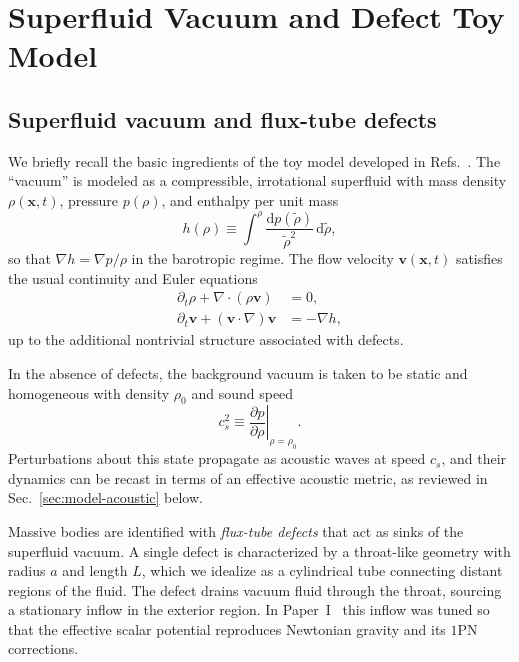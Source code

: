 \documentclass[11pt]{article}
\newcommand{\cS}{c_s}
\newcommand{\dd}{\mathrm{d}}
\begin{document}
\section{Superfluid Vacuum and Defect Toy Model}
\label{sec:model}

\subsection{Superfluid vacuum and flux-tube defects}

We briefly recall the basic ingredients of the toy model developed in Refs.~\cite{Norris:2025Orbits,Norris:Paper2,Norris:Paper3}.  The ``vacuum'' is modeled as a compressible, irrotational superfluid with mass density $\rho(\mathbf{x},t)$, pressure $p(\rho)$, and enthalpy per unit mass
\begin{equation}
h(\rho) \equiv \int^{\rho} \frac{\dd p(\tilde{\rho})}{\tilde{\rho}^2}\,\dd\tilde{\rho},
\end{equation}
so that $\nabla h = \nabla p / \rho$ in the barotropic regime.  The flow velocity $\mathbf{v}(\mathbf{x},t)$ satisfies the usual continuity and Euler equations
\begin{align}
\partial_t \rho + \nabla \cdot (\rho \mathbf{v}) &= 0,
\label{eq:fluid-continuity}\\[4pt]
\partial_t \mathbf{v} + (\mathbf{v} \cdot \nabla)\mathbf{v} &= -\nabla h,
\label{eq:euler}
\end{align}
up to the additional nontrivial structure associated with defects.

In the absence of defects, the background vacuum is taken to be static and homogeneous with density $\rho_0$ and sound speed
\begin{equation}
\cS^2 \equiv \left.\frac{\partial p}{\partial \rho}\right|_{\rho=\rho_0}.
\end{equation}
Perturbations about this state propagate as acoustic waves at speed $\cS$, and their dynamics can be recast in terms of an effective acoustic metric, as reviewed in Sec.~\ref{sec:model-acoustic} below.

Massive bodies are identified with \emph{flux-tube defects} that act as sinks of the superfluid vacuum.  A single defect is characterized by a throat-like geometry with radius $a$ and length $L$, which we idealize as a cylindrical tube connecting distant regions of the fluid.  The defect drains vacuum fluid through the throat, sourcing a stationary inflow in the exterior region.  In Paper~I~\cite{Norris:2025Orbits} this inflow was tuned so that the effective scalar potential reproduces Newtonian gravity and its $1$PN corrections.
\end{document}
